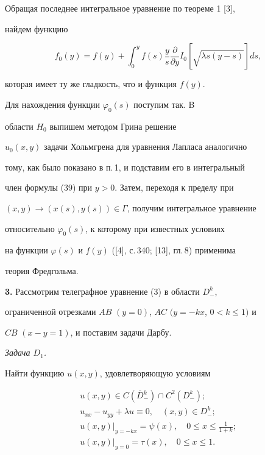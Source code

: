 Обращая последнее интегральное уравнение по теореме 1 [3],


найдем функцию


$$


f_0(y)=f(y)+\int_0^y f(s)\frac {y}{s}\frac {\partial }


{\partial y}I_0[\sqrt {\lambda s(y-s)}]ds,


$$


которая имеет ту же гладкость, что и функция $f(y)$.





Для нахождения функции $\varphi_0(s)$ поступим так. B


области $H_0$ выпишем методом Грина решение


$u_0(x,y)$ задачи Хольмгрена для уравнения Лапласа аналогично


тому, как было показано в п.\,1, и подставим его в интегральный


член формулы (39) при $y>0$. Затем, переходя к пределу при


$(x,y)\to (x(s),y(s))\in \Gamma$, получим интегральное уравнение


относительно $\varphi_0(s)$, к которому при известных условиях


на функции $\varphi (s)$ и $f(y)$ ([4], с.\,340; [13], гл.\,8) применима


теория Фредгольма.


\medskip





{\bf 3.} Рассмотрим телеграфное уравнение (3) в области $D_-^k$,


ограниченной отрезками $AB$ $(y=0)$, $AC$ $(y=-kx$, $0<k\le 1)$ и


$CB$ $(x-y=1)$, и поставим задачи Дарбу.


\medskip





{\it Задача $D_1$.} 


Найти функцию $u(x,y)$, удовлетворяющую условиям


\begin{gather}


u(x,y) \in C(\overline D{}_-^k)\cap C^2(D_-^k);\\


%


u_{xx}-u_{yy}+\lambda u\equiv 0, \quad (x,y)\in D_-^k;\\


%


u(x,y)\big|_{y=-kx}=\psi (x),


\quad 0\le x\le \frac{1}{1+k};\\


%


u(x,y)\big|_{y=0}=\tau (x),\quad 0\le x\le 1.


\end{gather}





